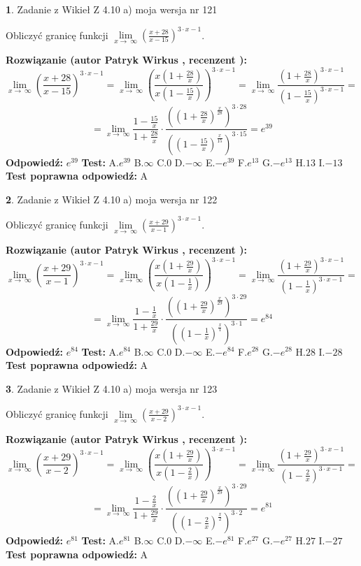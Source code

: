 \documentclass[12pt, a4paper]{article}
\theoremstyle{definition} %
\newtheorem{zad}{}
\newcommand{\zadStart}[1]{\begin{zad}#1\newline}
\newcommand{\zadStop}{\end{zad}}
\newcommand{\rozwStart}[2]{\noindent \textbf{Rozwiązanie (autor #1 , recenzent #2): }\newline}
\newcommand{\rozwStop}{\newline}
\newcommand{\odpStart}{\noindent \textbf{Odpowiedź:}\newline}
\newcommand{\odpStop}{\newline}
\newcommand{\testStart}{\noindent \textbf{Test:}\newline}
\newcommand{\testStop}{\newline}
\newcommand{\kluczStart}{\noindent \textbf{Test poprawna odpowiedź:}\newline}
\newcommand{\kluczStop}{\newline}
\begin{document}
\zadStart{Zadanie z Wikieł Z 4.10 a) moja wersja nr 121}

Obliczyć granicę funkcji  $\lim\limits_{x\to\ \infty}(\frac{x+28}{x-15})^{3\cdot x-1}$.
\zadStop
\rozwStart{Patryk Wirkus}{}
$$\lim\limits_{x\to\ \infty}(\frac{x+28}{x-15})^{3\cdot x-1} = \lim\limits_{x\to\ \infty}(\frac{x(1+\frac{28}{x})}{x(1-\frac{15}{x})})^{3\cdot x-1}=\lim\limits_{x\to\ \infty}\frac{(1+\frac{28}{x})^{3\cdot x-1}}{(1-\frac{15}{x})^{3\cdot x-1}}=$$
$$=\lim\limits_{x\to\ \infty}\frac{1-\frac{15}{x}}{1+\frac{28}{x}}\cdot\frac{((1+\frac{28}{x})^{\frac{x}{28}})^{3\cdot28}}{((1-\frac{15}{x})^{\frac{x}{15}})^{3\cdot15}}=e^{39}$$
\rozwStop
\odpStart
$e^{39}$
\odpStop
\testStart
A.$e^{39}$ B.$\infty$ C.$0$ D.$-\infty$ E.$-e^{39}$
F.$e^{13}$ G.$-e^{13}$
H.$13$
I.$-13$
\testStop
\kluczStart
A
\kluczStop



\zadStart{Zadanie z Wikieł Z 4.10 a) moja wersja nr 122}

Obliczyć granicę funkcji  $\lim\limits_{x\to\ \infty}(\frac{x+29}{x-1})^{3\cdot x-1}$.
\zadStop
\rozwStart{Patryk Wirkus}{}
$$\lim\limits_{x\to\ \infty}(\frac{x+29}{x-1})^{3\cdot x-1} = \lim\limits_{x\to\ \infty}(\frac{x(1+\frac{29}{x})}{x(1-\frac{1}{x})})^{3\cdot x-1}=\lim\limits_{x\to\ \infty}\frac{(1+\frac{29}{x})^{3\cdot x-1}}{(1-\frac{1}{x})^{3\cdot x-1}}=$$
$$=\lim\limits_{x\to\ \infty}\frac{1-\frac{1}{x}}{1+\frac{29}{x}}\cdot\frac{((1+\frac{29}{x})^{\frac{x}{29}})^{3\cdot29}}{((1-\frac{1}{x})^{\frac{x}{1}})^{3\cdot1}}=e^{84}$$
\rozwStop
\odpStart
$e^{84}$
\odpStop
\testStart
A.$e^{84}$ B.$\infty$ C.$0$ D.$-\infty$ E.$-e^{84}$
F.$e^{28}$ G.$-e^{28}$
H.$28$
I.$-28$
\testStop
\kluczStart
A
\kluczStop



\zadStart{Zadanie z Wikieł Z 4.10 a) moja wersja nr 123}

Obliczyć granicę funkcji  $\lim\limits_{x\to\ \infty}(\frac{x+29}{x-2})^{3\cdot x-1}$.
\zadStop
\rozwStart{Patryk Wirkus}{}
$$\lim\limits_{x\to\ \infty}(\frac{x+29}{x-2})^{3\cdot x-1} = \lim\limits_{x\to\ \infty}(\frac{x(1+\frac{29}{x})}{x(1-\frac{2}{x})})^{3\cdot x-1}=\lim\limits_{x\to\ \infty}\frac{(1+\frac{29}{x})^{3\cdot x-1}}{(1-\frac{2}{x})^{3\cdot x-1}}=$$
$$=\lim\limits_{x\to\ \infty}\frac{1-\frac{2}{x}}{1+\frac{29}{x}}\cdot\frac{((1+\frac{29}{x})^{\frac{x}{29}})^{3\cdot29}}{((1-\frac{2}{x})^{\frac{x}{2}})^{3\cdot2}}=e^{81}$$
\rozwStop
\odpStart
$e^{81}$
\odpStop
\testStart
A.$e^{81}$ B.$\infty$ C.$0$ D.$-\infty$ E.$-e^{81}$
F.$e^{27}$ G.$-e^{27}$
H.$27$
I.$-27$
\testStop
\kluczStart
A
\kluczStop
\end{document}
